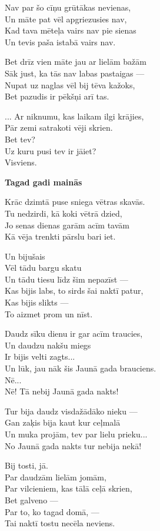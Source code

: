\documentclass[14pt]{extarticle}
\begin{document}
{{Nav par šo cīņu grūtākas nevienas,\\
Un māte pat vēl apgriezusies nav,\\
Kad tava mēteļa vairs nav pie sienas\\
Un tevis paša istabā vairs nav. 

Bet drīz vien māte jau ar lielām bažām\\
Sāk just, ka tās nav labas pastaigas ---\\
Nupat uz naglas vēl bij tēva kažoks,\\
Bet pazudis ir pēkšņi arī tas. 

... Ar niknumu, kas laikam ilgi krājies,\\
Pār zemi satrakoti vēji skrien.\\
Bet tev?\\
Uz kuru pusi tev ir jāiet?\\
Visviens. 

\newpage 

{\bf Tagad gadi mainās}

Krāc dzimtā puse sniega vētras skavās.\\
Tu nedzirdi, kā koki vētrā dzied,\\
Jo senas dienas garām acīm tavām\\
Kā vēja trenkti pārslu bari iet. 

Un bijušais\\
Vēl tādu bargu skatu\\
Un tādu tiesu līdz šim nepazīst ---\\
Kas bijis labs, to sirds šai naktī patur,\\
Kas bijis slikts ---\\
To aizmet prom un nīst. 

Daudz sīku dienu ir gar acīm traucies,\\
Un daudzu nakšu miegs\\
Ir bijis velti zagts...\\
Un lūk, jau nāk šis Jaunā gada brauciens.\\
Nē...\\
Nē! Tā nebij Jaunā gada nakts!

Tur bija daudz visdažādāko nieku ---\\
Gan zaķis bija kaut kur ceļmalā\\
Un muka projām, tev par lielu prieku...\\
No Jaunā gada nakts tur nebija nekā!

Bij tosti, jā.\\
Par daudzām lielām jomām,\\
Par vilcieniem, kas tālā ceļā skrien,\\
Bet galveno ---\\
Par to, ko tagad domā, ---\\
Tai naktī tostu necēla neviens. 

}}
\end{document}
